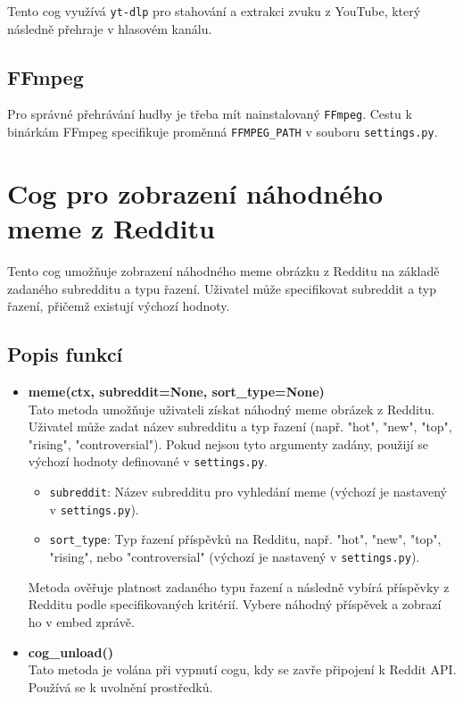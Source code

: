 \documentclass[12pt, a4paper]{report}
\begin{document}
Tento cog využívá \texttt{yt-dlp} pro stahování a extrakci zvuku z YouTube, který následně přehraje v hlasovém kanálu.

\subsection{FFmpeg}
Pro správné přehrávání hudby je třeba mít nainstalovaný \texttt{FFmpeg}. Cestu k binárkám FFmpeg specifikuje proměnná \texttt{FFMPEG\_PATH} v souboru \texttt{settings.py}.

\section{Cog pro zobrazení náhodného meme z Redditu}

Tento cog umožňuje zobrazení náhodného meme obrázku z Redditu na základě zadaného subredditu a typu řazení. Uživatel může specifikovat subreddit a typ řazení, přičemž existují výchozí hodnoty.

\subsection{Popis funkcí}

\begin{itemize}
    \item \textbf{meme(ctx, subreddit=None, sort\_type=None)} \\
    Tato metoda umožňuje uživateli získat náhodný meme obrázek z Redditu. Uživatel může zadat název subredditu a typ řazení (např. "hot", "new", "top", "rising", "controversial"). Pokud nejsou tyto argumenty zadány, použijí se výchozí hodnoty definované v \texttt{settings.py}.
    \begin{itemize}
        \item \texttt{subreddit}: Název subredditu pro vyhledání meme (výchozí je nastavený v \texttt{settings.py}).
        \item \texttt{sort\_type}: Typ řazení příspěvků na Redditu, např. "hot", "new", "top", "rising", nebo "controversial" (výchozí je nastavený v \texttt{settings.py}).
    \end{itemize}
    Metoda ověřuje platnost zadaného typu řazení a následně vybírá příspěvky z Redditu podle specifikovaných kritérií. Vybere náhodný příspěvek a zobrazí ho v embed zprávě.
    
    \item \textbf{cog\_unload()} \\
    Tato metoda je volána při vypnutí cogu, kdy se zavře připojení k Reddit API. Používá se k uvolnění prostředků.
\end{itemize}
\end{document}
